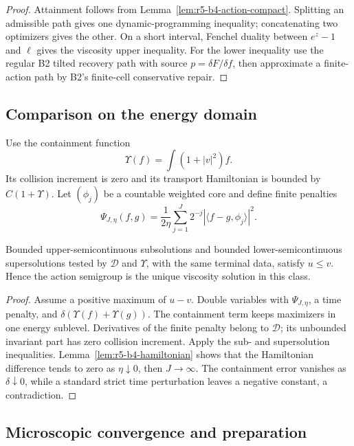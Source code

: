 \begin{proof}
Attainment follows from Lemma~\ref{lem:r5-b4-action-compact}.  Splitting an
admissible path gives one dynamic-programming inequality; concatenating two
optimizers gives the other.  On a short interval, Fenchel duality between
\(e^z-1\) and \(\ell\) gives the viscosity upper inequality.  For the lower
inequality use the regular B2 tilted recovery path with source
\(p=\delta F/\delta f\), then approximate a finite-action path by B2's
finite-cell conservative repair.
\end{proof}

\subsection{Comparison on the energy domain}

Use the containment function
\[
 \Upsilon(f)=\int(1+|v|^2)f.
\]
Its collision increment is zero and its transport Hamiltonian is bounded by
\(C(1+\Upsilon)\).  Let \((\phi_j)\) be a countable weighted core and define
finite penalties
\[
 \Psi_{J,\eta}(f,g)=
 \frac1{2\eta}\sum_{j=1}^J2^{-j}
 |\langle f-g,\phi_j\rangle|^2.
\]

\begin{theorem}
\label{thm:r5-b4-comparison}
Bounded upper-semicontinuous subsolutions and bounded lower-semicontinuous
supersolutions tested by \(\mathscr D\) and \(\Upsilon\), with the same
terminal data, satisfy \(u\le v\).  Hence the action semigroup is the unique
viscosity solution in this class.
\end{theorem}

\begin{proof}
Assume a positive maximum of \(u-v\).  Double variables with
\(\Psi_{J,\eta}\), a time penalty, and
\(\delta(\Upsilon(f)+\Upsilon(g))\).  The containment term keeps maximizers in
one energy sublevel.  Derivatives of the finite penalty belong to
\(\mathscr D\); its unbounded invariant part has zero collision increment.
Apply the sub- and supersolution inequalities.  Lemma~\ref{lem:r5-b4-hamiltonian}
shows that the Hamiltonian difference tends to zero as
\(\eta\downarrow0\), then \(J\to\infty\).  The containment error vanishes as
\(\delta\downarrow0\), while a standard strict time perturbation leaves a
negative constant, a contradiction.
\end{proof}

\subsection{Microscopic convergence and preparation}

